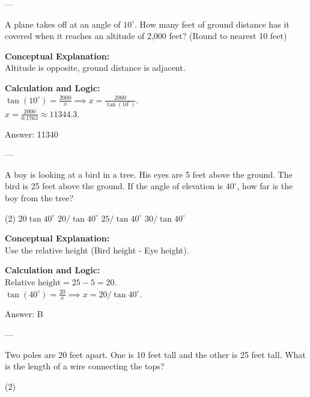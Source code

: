 \documentclass[11pt,paper=a4,answers]{exam}
\begin{document}
\begin{questions}
---

\question
A plane takes off at an angle of $10^\circ$. How many feet of ground distance has it covered when it reaches an altitude of 2,000 feet? (Round to nearest 10 feet)

\begin{solution}
\textbf{Conceptual Explanation:} \\
Altitude is opposite, ground distance is adjacent.

\vspace{10pt}
\textbf{Calculation and Logic:} \\
$\tan(10^\circ) = \frac{2000}{x} \implies x = \frac{2000}{\tan(10^\circ)}$. \\
$x = \frac{2000}{0.1763} \approx 11344.3$.

\vspace{15pt}
Answer: \colorbox{yellow!100}{11340}
\end{solution}

---

\question
A boy is looking at a bird in a tree. His eyes are 5 feet above the ground. The bird is 25 feet above the ground. If the angle of elevation is $40^\circ$, how far is the boy from the tree?
\begin{tasks}(2)
    \task $20 \tan 40^\circ$
    \task $20 / \tan 40^\circ$
    \task $25 / \tan 40^\circ$
    \task $30 / \tan 40^\circ$
\end{tasks}

\begin{solution}
\textbf{Conceptual Explanation:} \\
Use the relative height (Bird height - Eye height).

\vspace{10pt}
\textbf{Calculation and Logic:} \\
$\text{Relative height} = 25 - 5 = 20$. \\
$\tan(40^\circ) = \frac{20}{x} \implies x = 20 / \tan 40^\circ$.

\vspace{15pt}
Answer: \colorbox{yellow!100}{B}
\end{solution}

---

\question
Two poles are 20 feet apart. One is 10 feet tall and the other is 25 feet tall. What is the length of a wire connecting the tops?
\begin{tasks}(2)
\end{tasks}


\end{questions}
\end{document}
